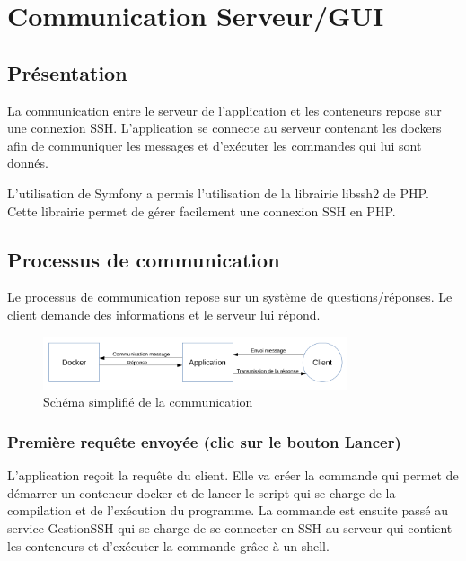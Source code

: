 \section{Communication Serveur/GUI}

\subsection{Présentation}

\par La communication entre le serveur de l'application et les conteneurs repose sur une connexion SSH. L'application se connecte au serveur contenant les dockers afin de communiquer les messages et d'exécuter les commandes qui lui sont donnés.

\par L'utilisation de Symfony a permis l'utilisation de la librairie libssh2 de PHP. Cette librairie permet de gérer facilement une connexion SSH en PHP.

\subsection{Processus de communication}

\par Le processus de communication repose sur un système de questions/réponses. Le client demande des informations et le serveur lui répond.

\begin{figure}[H]
\centering
\includegraphics[width=0.8\textwidth]{./img/com.png}
\caption{Schéma simplifié de la communication}
\end{figure}


\subsubsection{Première requête envoyée (clic sur le bouton Lancer)}

\par L'application reçoit la requête du client. Elle va créer la commande qui permet de démarrer un conteneur docker et de lancer le script qui se charge de la compilation et de l'exécution du programme. La commande est ensuite passé au service GestionSSH qui se charge de se connecter en SSH au serveur qui contient les conteneurs et d'exécuter la commande grâce à un shell. 

